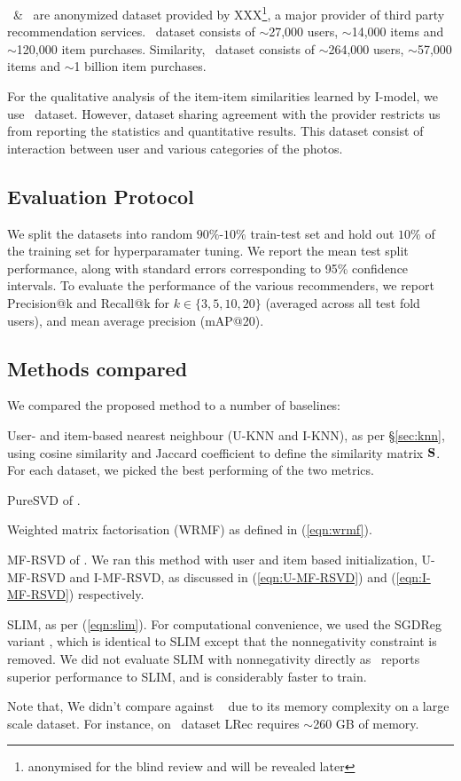 \Lowes\ \& \Guitar \ are anonymized dataset provided by XXX\footnote{{\scriptsize anonymised for the blind review and will be revealed later}}, a major provider of third party recommendation services. \Guitar \ dataset consists of $\sim$27,000 users, $\sim$14,000 items and $\sim$120,000 item purchases. Similarity, \Lowes \ dataset consists of $\sim$264,000 users, $\sim$57,000 items and $\sim$1 billion item purchases. 

For the qualitative analysis of the item-item similarities learned by I-\LinearLow model, we use \Fotolia\ dataset. However, dataset sharing agreement with the provider restricts us from reporting the statistics and quantitative results. This dataset consist of interaction between user and various categories of the photos. 

\subsection{Evaluation Protocol}
We split the datasets into random $90\%$-$10\%$ train-test set and hold out $10\%$ of the training set for hyperparamater tuning. We report the mean test split performance, along with standard errors corresponding to 95\% confidence intervals.
To evaluate the performance of the various recommenders, we report Precision@k and Recall@k for $k \in \{ 3, 5, 10, 20 \}$ (averaged across all test fold users), and mean average precision (mAP@20).


\subsection{Methods compared}

We compared the proposed method to a number of baselines:
\begin{compactitem}

	\item User- and item-based nearest neighbour (U-KNN and I-KNN), as per \S\ref{sec:knn}, using  cosine similarity and Jaccard coefficient to define the similarity matrix $\mathbf{S}$. For each dataset, we picked the best performing of the two metrics.

	\item PureSVD of \citet{Cremonesi:2010}.

	\item Weighted matrix factorisation (WRMF) as defined in (\ref{eqn:wrmf}).

	\item MF-RSVD of \citet{Tang:2013}.  We ran this method with user and item based initialization, U-MF-RSVD  and I-MF-RSVD, as discussed in (\ref{eqn:U-MF-RSVD}) and (\ref{eqn:I-MF-RSVD}) respectively.
	\item SLIM, as per (\ref{eqn:slim}). For computational convenience, we used the SGDReg variant \citep{Levy:2013}, which is identical to SLIM  except that the nonnegativity constraint is removed. We did not evaluate SLIM with nonnegativity directly as~\citet{Levy:2013} reports superior performance to SLIM, and is considerably faster to train.
\end{compactitem}
Note that, We didn't compare against ~\citep{Sedhain:2016} due to its memory complexity on a large scale dataset. For instance, on \Lowes \ dataset LRec requires $\sim$260 GB of memory. 